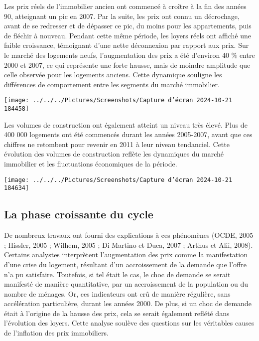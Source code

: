 \documentclass[a4paper, 12pt]{report}
\begin{document}
Les prix réels de l'immobilier ancien ont commencé à croître à la fin des années 90, atteignant un pic en 2007. Par la suite, les prix ont connu un décrochage, avant de se redresser et de dépasser ce pic, du moins pour les appartements, puis de fléchir à nouveau. Pendant cette même période, les loyers réels ont affiché une faible croissance, témoignant d'une nette déconnexion par rapport aux prix. Sur le marché des logements neufs, l'augmentation des prix a été d'environ 40 \% entre 2000 et 2007, ce qui représente une forte hausse, mais de moindre amplitude que celle observée pour les logements anciens. Cette dynamique souligne les différences de comportement entre les segments du marché immobilier.

\begin{center}
	\texttt{[image: ../../../Pictures/Screenshots/Capture d'écran 2024-10-21 184458]}
\end{center}

Les volumes de construction ont également atteint un niveau très élevé. Plus de 400 000 logements ont été commencés durant les années 2005-2007, avant que ces chiffres ne retombent pour revenir en 2011 à leur niveau tendanciel. Cette évolution des volumes de construction reflète les dynamiques du marché immobilier et les fluctuations économiques de la période.

\begin{center}
	\texttt{[image: ../../../Pictures/Screenshots/Capture d'écran 2024-10-21 184634]}
\end{center}

\subsection{La phase croissante du cycle}

De nombreux travaux ont fourni des explications à ces phénomènes (OCDE, 2005 ; Hissler, 2005 ; Wilhem, 2005 ; Di Martino et Duca, 2007 ; Arthus et Alii, 2008). Certains analystes interprètent l'augmentation des prix comme la manifestation d'une crise du logement, résultant d'un accroissement de la demande que l'offre n'a pu satisfaire. Toutefois, si tel était le cas, le choc de demande se serait manifesté de manière quantitative, par un accroissement de la population ou du nombre de ménages. Or, ces indicateurs ont crû de manière régulière, sans accélération particulière, durant les années 2000. De plus, si un choc de demande était à l'origine de la hausse des prix, cela se serait également reflété dans l'évolution des loyers. Cette analyse soulève des questions sur les véritables causes de l'inflation des prix immobiliers.
\end{document}
